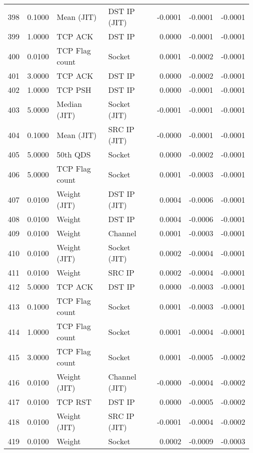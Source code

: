 \begin{longtable}{lrllrrr}
398 & 0.1000 & Mean (JIT) & DST IP (JIT) & -0.0001 & -0.0001 & -0.0001 \\
399 & 1.0000 & TCP ACK & DST IP & 0.0000 & -0.0001 & -0.0001 \\
400 & 0.0100 & TCP Flag count & Socket & 0.0001 & -0.0002 & -0.0001 \\
401 & 3.0000 & TCP ACK & DST IP & 0.0000 & -0.0002 & -0.0001 \\
402 & 1.0000 & TCP PSH & DST IP & 0.0000 & -0.0001 & -0.0001 \\
403 & 5.0000 & Median (JIT) & Socket (JIT) & -0.0001 & -0.0001 & -0.0001 \\
404 & 0.1000 & Mean (JIT) & SRC IP (JIT) & -0.0000 & -0.0001 & -0.0001 \\
405 & 5.0000 & 50th QDS & Socket & 0.0000 & -0.0002 & -0.0001 \\
406 & 5.0000 & TCP Flag count & Socket & 0.0001 & -0.0003 & -0.0001 \\
407 & 0.0100 & Weight (JIT) & DST IP (JIT) & 0.0004 & -0.0006 & -0.0001 \\
408 & 0.0100 & Weight & DST IP & 0.0004 & -0.0006 & -0.0001 \\
409 & 0.0100 & Weight & Channel & 0.0001 & -0.0003 & -0.0001 \\
410 & 0.0100 & Weight (JIT) & Socket (JIT) & 0.0002 & -0.0004 & -0.0001 \\
411 & 0.0100 & Weight & SRC IP & 0.0002 & -0.0004 & -0.0001 \\
412 & 5.0000 & TCP ACK & DST IP & 0.0000 & -0.0003 & -0.0001 \\
413 & 0.1000 & TCP Flag count & Socket & 0.0001 & -0.0003 & -0.0001 \\
414 & 1.0000 & TCP Flag count & Socket & 0.0001 & -0.0004 & -0.0001 \\
415 & 3.0000 & TCP Flag count & Socket & 0.0001 & -0.0005 & -0.0002 \\
416 & 0.0100 & Weight (JIT) & Channel (JIT) & -0.0000 & -0.0004 & -0.0002 \\
417 & 0.0100 & TCP RST & DST IP & 0.0000 & -0.0005 & -0.0002 \\
418 & 0.0100 & Weight (JIT) & SRC IP (JIT) & -0.0001 & -0.0004 & -0.0002 \\
419 & 0.0100 & Weight & Socket & 0.0002 & -0.0009 & -0.0003 \\
\end{longtable}
